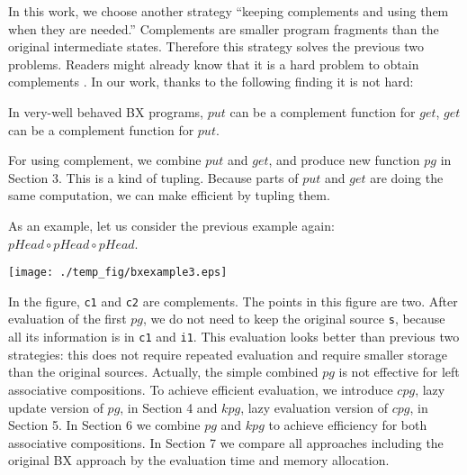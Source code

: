 In this work, we choose another strategy ``keeping complements and using them when they are needed.'' Complements are smaller program fragments than the original intermediate states. Therefore this strategy solves the previous two problems.
Readers might already know that it is a hard problem to obtain complements \cite{}. In our work, thanks to the following finding it is not hard:

\vspace{2mm}
In very-well behaved BX programs, 
$put$ can be a complement function for $get$, $get$ can be a complement function for $put$.
\vspace{2mm}

For using complement, we combine $put$ and $get$, and produce new function $pg$ in Section 3.
This is a kind of tupling. Because parts of $put$ and $get$ are doing the same computation, we can make efficient by tupling them.

As an example, let us consider the previous example again: $pHead \circ pHead \circ pHead$.


\begin{center}
  \texttt{[image: ./temp\_fig/bxexample3.eps]}
\end{center}


In the figure, \texttt{c1} and \texttt{c2} are complements. The points in this figure are two. After evaluation of the first $pg$, we do not need to keep the original source \texttt{s}, because all its information is in \texttt{c1} and \texttt{i1}. 
This evaluation looks better than previous two strategies: this does not require repeated evaluation and require smaller storage than the original sources. 
Actually, the simple combined $pg$ is not effective for left associative compositions. To achieve efficient evaluation, we introduce $cpg$, lazy update version of $pg$, in Section 4 and $kpg$, lazy evaluation version of $cpg$, in Section 5. In Section 6 we combine $pg$ and $kpg$ to achieve efficiency for both associative compositions. In Section 7 we compare all approaches including the original BX approach by the evaluation time and memory allocation. 




